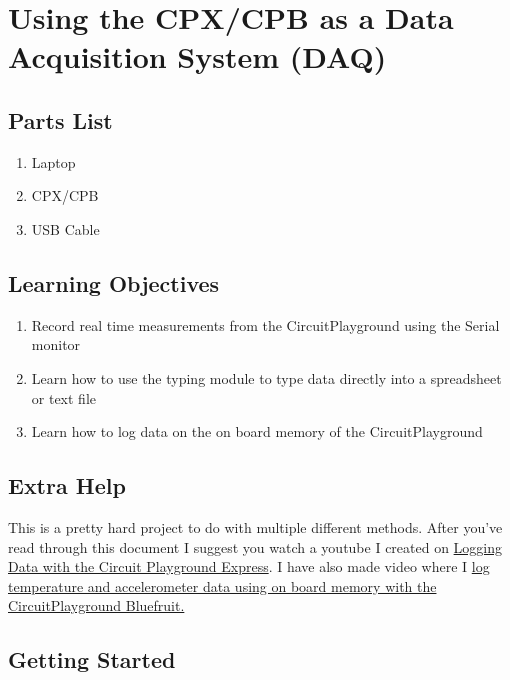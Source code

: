 \section{Using the CPX/CPB as a Data Acquisition System (DAQ)}
\label{s:daq}

\subsection{Parts List}

\begin{enumerate}[itemsep=-5pt]
\item Laptop
\item CPX/CPB
\item USB Cable
\end{enumerate}

\subsection{Learning Objectives}
\begin{enumerate}[itemsep=-5pt]
\item Record real time measurements from the CircuitPlayground using the Serial monitor
\item Learn how to use the typing module to type data directly into a spreadsheet or text file
\item Learn how to log data on the on board memory of the CircuitPlayground 
\end{enumerate}

\subsection{Extra Help}

This is a pretty hard project to do with multiple different
methods. After you’ve read through this document I suggest you watch
a youtube I created on \href{https://youtu.be/yX0zeIfn2j4}{Logging Data with the Circuit Playground
Express}. I have also made video where I \href{https://www.youtube.com/watch?v=Vc7_KxRnORI}{log temperature and
accelerometer data using on board memory with the CircuitPlayground
Bluefruit.}

\subsection{Getting Started}

